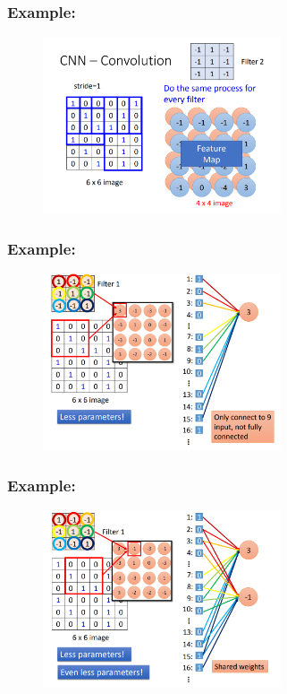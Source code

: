 \documentclass{beamer}
\begin{document}
    \begin{frame}
    \frametitle{Example: }
        \begin{figure}[H]
            \begin{center}
                \includegraphics[width=7cm]{ppt5}
            \end{center}
        \end{figure}
    \end{frame}
    \begin{frame}
    \frametitle{Example: }
        \begin{figure}[H]
            \begin{center}
                \includegraphics[width=7cm]{ppt6}
            \end{center}
        \end{figure}
    \end{frame}
    \begin{frame}
    \frametitle{Example: }
        \begin{figure}[H]
            \begin{center}
                \includegraphics[width=7cm]{ppt7}
            \end{center}
        \end{figure}
    \end{frame}
\end{document}

